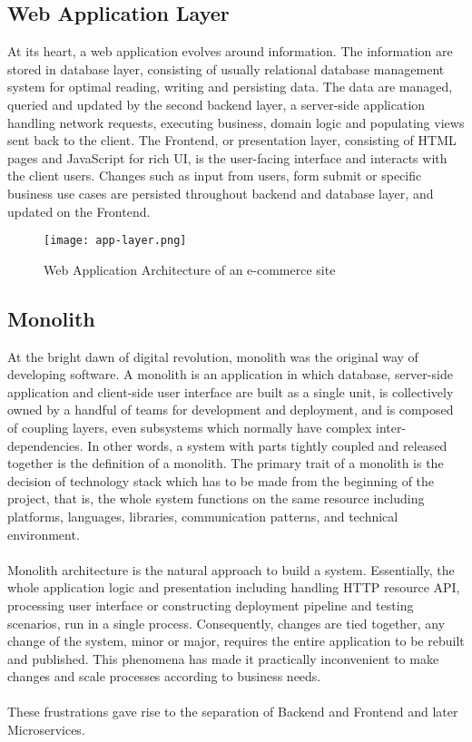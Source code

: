 \documentclass[a4paper]{book}
\begin{document}
\subsection{Web Application Layer}
At its heart, a web application evolves around information. The information are stored in database layer, consisting of usually relational database management system for optimal reading, writing and persisting data. The data are managed, queried and updated by the second backend layer, a server-side application handling network requests, executing business, domain logic and populating views sent back to the client. The Frontend, or presentation layer, consisting of HTML pages and JavaScript for rich UI, is the user-facing interface and interacts with the client users. Changes such as input from users, form submit or specific business use cases are persisted throughout backend and database layer, and updated on the Frontend. 
\begin{figure}
    \centering
    \texttt{[image: app-layer.png]}
    \caption{Web Application Architecture of an e-commerce site \cite{micro-frontends.org}}
    \label{fig:my_label}
\end{figure}

\subsection{Monolith}

At the bright dawn of digital revolution, monolith was the original way of developing software. A monolith is an application in which database, server-side application and client-side user interface are built as a single unit, is collectively owned by a handful of teams for development and deployment, and is composed of coupling layers, even subsystems which normally have complex inter-dependencies. In other words, a system with parts tightly coupled and released together is the definition of a monolith. The primary trait of a monolith is the decision of technology stack which has to be made from the beginning of the project, that is, the whole system functions on the same resource including platforms, languages, libraries, communication patterns, and technical environment.
\\ \\ 
Monolith architecture is the natural approach to build a system. Essentially, the whole application logic and presentation including handling HTTP resource API, processing user interface or constructing deployment pipeline and testing scenarios, run in a single process. Consequently, changes are tied together, any change of the system, minor or major, requires the entire application to be rebuilt and published. This phenomena has made it practically inconvenient to make changes and scale processes according to business needs. 
\\ \\
These frustrations gave rise to the separation of Backend and Frontend and later Microservices.
\end{document}
